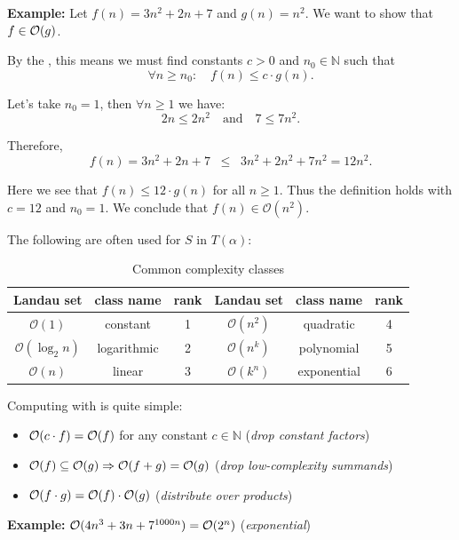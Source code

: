 \textbf{Example: }Let $f(n) = 3n^2 + 2n + 7$ and $g(n) = n^2$.  
We want to show that $f \in \mathcal{O}(g)$.  

By the , this means we must find constants $c > 0$ and $n_0 \in \mathbb{N}$ such that
\[
\forall n \geq n_0 : \quad f(n) \leq c \cdot g(n).
\]

Let's take $n_0 = 1$, then $\forall n \geq 1$ we have:
\[
2n \leq 2n^2 \quad \text{and} \quad 7 \leq 7n^2.
\]

Therefore,
\[
f(n) = 3n^2 + 2n + 7 \;\;\leq\;\; 3n^2 + 2n^2 + 7n^2 = 12n^2.
\]

Here we see that $f(n) \leq 12 \cdot g(n)$ for all $n \geq 1$.  
Thus the definition holds with $c = 12$ and $n_0 = 1$.  
We conclude that $f(n) \in \mathcal{O}(n^2)$.

The following  are often used for $S$ in $T(\alpha)$:
\begin{table}[h]
\centering
\begin{tabular}{|c|c|c||c|c|c|}
\hline
\textbf{Landau set} & \textbf{class name} & \textbf{rank} &
\textbf{Landau set} & \textbf{class name} & \textbf{rank} \\
\hline
$\mathcal{O}(1)$          & constant     & 1 & $\mathcal{O}(n^2)$ & quadratic   & 4 \\
$\mathcal{O}(\log_2 n)$   & logarithmic  & 2 & $\mathcal{O}(n^k)$ & polynomial  & 5 \\
$\mathcal{O}(n)$          & linear       & 3 & $\mathcal{O}(k^n)$ & exponential & 6 \\
\hline
\end{tabular}
\caption{Common complexity classes}
\end{table}

Computing with  is quite simple:
\begin{itemize}
    \item $\mathcal{O}( c \cdot f) = \mathcal{O}(f)$ for any constant $c \in \mathbb{N}$ (\textit{drop constant factors})
    \item $\mathcal{O}(f) \subseteq \mathcal{O}(g) \Rightarrow \mathcal{O}(f + g) = \mathcal{O}(g)$ (\textit{drop low-complexity summands})
    \item $\mathcal{O}(f \cdot g) = \mathcal{O}(f) \cdot \mathcal{O}(g)$ (\textit{distribute over products})
\end{itemize}
\textbf{Example: }$\mathcal{O}(4n^3 + 3n + 7^{1000n}) = \mathcal{O}(2^n)$ (\textit{exponential})

